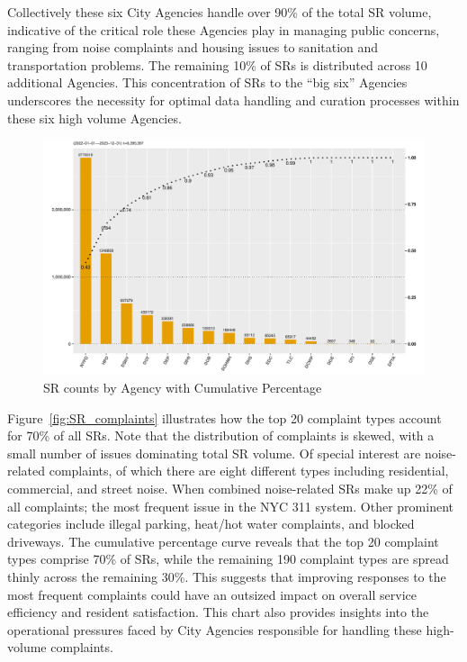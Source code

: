 \documentclass[linenumber]{jdsart}
\begin{document}
Collectively these six City Agencies handle over 90\% of the total SR 
volume, indicative of the critical role these Agencies play in managing
public concerns, ranging from noise complaints and housing issues to
sanitation and transportation problems. The remaining
10\% of SRs is distributed across 10 additional Agencies. 
This concentration of SRs to the ``big six'' Agencies 
underscores the necessity for optimal data handling and 
curation processes within these six high volume Agencies.

\begin{figure}[tbp]
	\centering
	\includegraphics[width = \textwidth]{SRs_by_Agency.pdf}
  	\caption{SR counts by Agency with Cumulative Percentage}
	\label{fig:SRcountbyAgency}
\end{figure}

Figure~\ref{fig:SR_complaints}
illustrates how the top 20 complaint types account for 70\% 
of all SRs. Note that the distribution of complaints is skewed, 
with a small number of issues dominating total SR volume. 
Of special interest are noise\mbox{-}related complaints, of which there are eight different
types including residential, commercial, and 
street noise. When combined noise\mbox{-}related SRs make up 22\% of all 
complaints; the most frequent issue in the NYC 311 system. 
Other prominent categories include illegal parking, heat/hot water 
complaints, and blocked driveways. The cumulative percentage curve 
reveals that the top 20 complaint types comprise 70\% of SRs,
while the remaining 190 complaint types are spread thinly 
across the remaining 30\%. This suggests that improving 
responses to the most frequent complaints could have an 
outsized impact on overall service efficiency and resident 
satisfaction. This chart also provides insights into the 
operational pressures faced by City Agencies 
responsible for handling these high-volume complaints.
\end{document}
